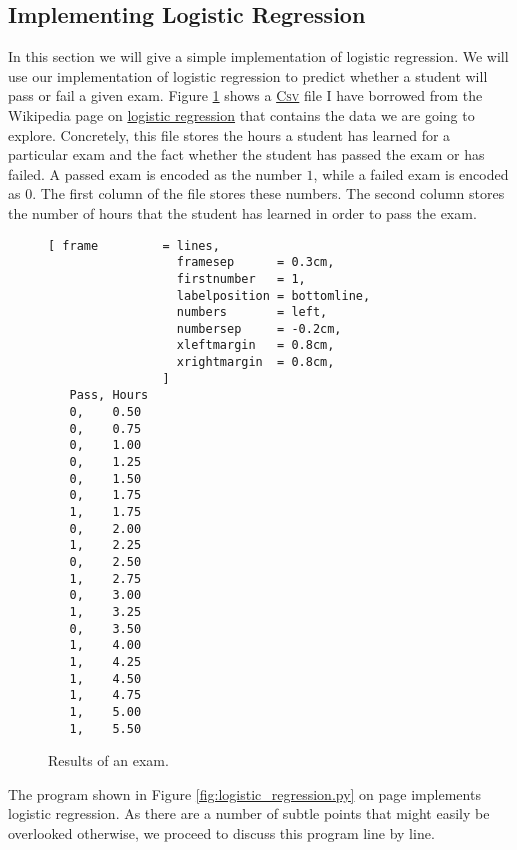 \subsection{Implementing Logistic Regression}
In this section we will give a simple implementation of logistic regression.  We will use our implementation of
logistic regression to predict whether a student will pass or fail a given exam.  Figure \ref{fig:exam.csv}
shows a \href{https://en.wikipedia.org/wiki/Comma-separated_values}{\textsc{Csv}} file I have borrowed from the
Wikipedia page on \href{https://en.wikipedia.org/wiki/Logistic_regression}{logistic regression} that contains
the data we are going to explore.  Concretely, this file stores the hours a student has learned for a particular exam
and the fact whether the student has passed the exam or has failed.  A passed exam is encoded as the number
$1$, while a failed exam is encoded as $0$.  The first column of the file stores these numbers.  The second
column stores the number of hours that the student has learned in order to pass the exam.


\begin{figure}[!ht]
\centering
\begin{Verbatim}[ frame         = lines, 
                  framesep      = 0.3cm, 
                  firstnumber   = 1,
                  labelposition = bottomline,
                  numbers       = left,
                  numbersep     = -0.2cm,
                  xleftmargin   = 0.8cm,
                  xrightmargin  = 0.8cm,
                ]
   Pass, Hours
   0,    0.50
   0,    0.75
   0,    1.00
   0,    1.25
   0,    1.50
   0,    1.75
   1,    1.75
   0,    2.00
   1,    2.25
   0,    2.50
   1,    2.75
   0,    3.00
   1,    3.25
   0,    3.50
   1,    4.00
   1,    4.25
   1,    4.50
   1,    4.75
   1,    5.00
   1,    5.50
\end{Verbatim}
\vspace*{-0.3cm}
\caption{Results of an exam.}
\label{fig:exam.csv}
\end{figure}

The program shown in Figure \ref{fig:logistic_regression.py} on page
\pageref{fig:logistic_regression.py} implements logistic regression.  As there are a number of
subtle points that might easily be overlooked otherwise, we proceed to discuss this program line by line. 


